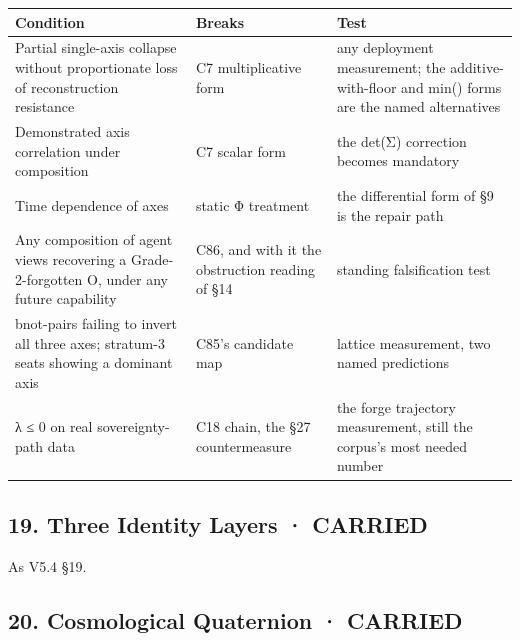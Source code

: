 \documentclass[
]{article}
\newcounter{none} %
\begin{document}
{\def\LTcaptype{none} %
\begin{longtable}[]{@{}
  >{\raggedright\arraybackslash}p{}
  >{\raggedright\arraybackslash}p{}
  >{\raggedright\arraybackslash}p{}@{}}
\toprule\noalign{}
\begin{minipage}[b]{\linewidth}\raggedright
Condition
\end{minipage} & \begin{minipage}[b]{\linewidth}\raggedright
Breaks
\end{minipage} & \begin{minipage}[b]{\linewidth}\raggedright
Test
\end{minipage} \\
\midrule\noalign{}
\endhead
\bottomrule\noalign{}
\endlastfoot
Partial single-axis collapse without proportionate loss of
reconstruction resistance & C7 multiplicative form & any deployment
measurement; the additive-with-floor and min() forms are the named
alternatives \\
Demonstrated axis correlation under composition & C7 scalar form & the
det(Σ) correction becomes mandatory \\
Time dependence of axes & static Φ treatment & the differential form of
§9 is the repair path \\
Any composition of agent views recovering a Grade-2-forgotten O, under
any future capability & C86, and with it the obstruction reading of §14
& standing falsification test \\
bnot-pairs failing to invert all three axes; stratum-3 seats showing a
dominant axis & C85's candidate map & lattice measurement, two named
predictions \\
λ ≤ 0 on real sovereignty-path data & C18 chain, the §27 countermeasure
& the forge trajectory measurement, still the corpus's most needed
number \\
\end{longtable}
}

\subsection{19. Three Identity Layers ·
CARRIED}\label{three-identity-layers-carried}

As V5.4 §19.

\subsection{20. Cosmological Quaternion ·
CARRIED}\label{cosmological-quaternion-carried}
\end{document}
